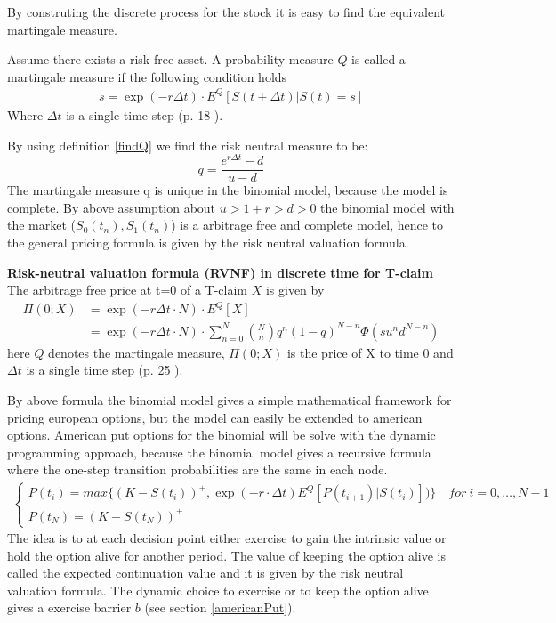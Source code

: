 By construting the discrete process for the stock it is easy to find the equivalent martingale measure. 
\begin{definition}\label{findQ}
Assume there exists a risk free asset. A probability measure $Q$ is called a martingale measure if the following condition holds 
\begin{align}
s= \exp(- r \Delta t) \cdot E^Q[S(t+\Delta t)|S(t)=s] 
\end{align}
Where $\Delta t$ is a single time-step (p. 18 \parencite{Bjork19}).
\end{definition}
By using definition \ref{findQ} we find the risk neutral measure to be:
$$q=\frac{e^{r \Delta t}-d}{u-d}$$
The martingale measure q is unique in the binomial model, because the model is complete. By above assumption about $u>1+r>d>0$ the binomial model with the market ($S_0(t_n), S_1(t_n)$) is a arbitrage free and complete model, hence to the general pricing formula is given by the risk neutral valuation formula.
\begin{theorem}\label{RNVF-Discrete}
\textbf{Risk-neutral valuation formula (RVNF) in discrete time for T-claim}
The arbitrage free price at t=0 of a T-claim $X$ is given by
\begin{align}
\Pi(0;X)&= \exp(- r \Delta t \cdot N) \cdot E^Q[X]\\
&=\exp(- r \Delta t \cdot N) \cdot \sum_{n=0}^{N} \binom{N}{n} q^n (1-q)^{N-n} \Phi(su^n d^{N-n})
\end{align}
here $Q$ denotes the martingale measure, $\Pi(0;X)$ is the price of X to time 0 and $\Delta t$ is a single time step (p. 25 \parencite{Bjork19}).
\end{theorem}

By above formula the binomial model gives a simple mathematical framework for pricing european options, but the model can easily be extended to american options. American put options for the binomial will be solve with the dynamic programming approach, because the binomial model gives a recursive formula where the one-step transition probabilities are the same in each node.
\begin{equation}\label{BellmanEq2}
\begin{split}
\begin{cases}
          P(t_i) = max\{ (K-S(t_i))^+, \exp(-r\cdot \Delta t) E^Q[P(t_{i+1})|S(t_i)])\} \quad for \ i={0,\ldots,N-1} \\
          P(t_N) = (K-S(t_N))^+ 
\end{cases}
\end{split}
\end{equation}
The idea is to at each decision point either exercise to gain the intrinsic value or hold the option alive for another period. The value of keeping the option alive is called the expected continuation value and it is given by the risk neutral valuation formula. The dynamic choice to exercise or to keep the option alive gives a exercise barrier $b$ (see section \ref{americanPut}).\\

